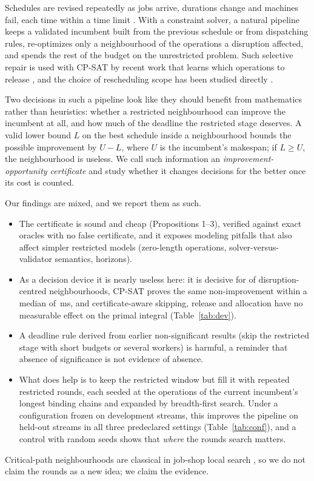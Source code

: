 \documentclass[letterpaper]{article} %
\begin{document}
Schedules are revised repeatedly as jobs arrive, durations change and machines fail, each time within a time limit \citep{vieira2003,ouelhadj2009}. With a constraint solver, a natural pipeline keeps a validated incumbent built from the previous schedule or from dispatching rules, re-optimizes only a neighbourhood of the operations a disruption affected, and spends the rest of the budget on the unrestricted problem. Such selective repair is used with CP-SAT by recent work that learns which operations to release \citep{linyang2026}, and the choice of rescheduling scope has been studied directly \citep{sun2026}.

Two decisions in such a pipeline look like they should benefit from mathematics rather than heuristics: whether a restricted neighbourhood can improve the incumbent at all, and how much of the deadline the restricted stage deserves. A valid lower bound $L$ on the best schedule inside a neighbourhood bounds the possible improvement by $U-L$, where $U$ is the incumbent's makespan; if $L \ge U$, the neighbourhood is useless. We call such information an \emph{improvement-opportunity certificate} and study whether it changes decisions for the better once its cost is counted.

Our findings are mixed, and we report them as such.
\begin{itemize}
\item The certificate is sound and cheap (Propositions 1--3), verified against exact oracles with no false certificate, and it exposes modeling pitfalls that also affect simpler restricted models (zero-length operations, solver-versus-validator semantics, horizons).
\item As a decision device it is nearly useless here: it is decisive for \PilotCertDecisive{} of \PilotCertSteps{} disruption-centred neighbourhoods, CP-SAT proves the same non-improvement within a median of \DiagInfeasibleMs\,ms, and certificate-aware skipping, release and allocation have no measurable effect on the primal integral (Table~\ref{tab:dev}).
\item A deadline rule derived from earlier non-significant results (skip the restricted stage with short budgets or several workers) is harmful, a reminder that absence of significance is not evidence of absence.
\item What does help is to keep the restricted window but fill it with repeated restricted rounds, each seeded at the operations of the current incumbent's longest binding chains and expanded by breadth-first search. Under a configuration frozen on development streams, this improves the pipeline on held-out streams in all three predeclared settings (Table~\ref{tab:conf}), and a control with random seeds shows that \emph{where} the rounds search matters.
\end{itemize}
Critical-path neighbourhoods are classical in job-shop local search \citep{vanlaarhoven1992,nowicki1996,balas1998}, so we do not claim the rounds as a new idea; we claim the evidence.
\end{document}
